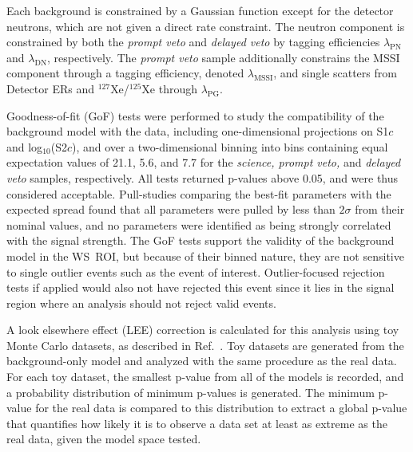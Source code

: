 Each background is constrained by a Gaussian function except for the detector neutrons, which are not given a direct rate constraint.
The neutron component is constrained by both the \emph{prompt veto} and \emph{delayed veto} by tagging efficiencies $\lambda_\text{PN}$ and $\lambda_\text{DN}$, respectively.
The \emph{prompt veto} sample additionally constrains the MSSI component through a tagging efficiency, denoted $\lambda_\text{MSSI}$, and single scatters from Detector ERs and $^{127}$Xe/$^{125}$Xe through $\lambda_\text{PG}$.


Goodness-of-fit (GoF) tests were performed to study the compatibility of the background model with the data, including one-dimensional projections on S1$c$ and log$_{10}$(S2$c$), and over a two-dimensional binning into bins containing equal expectation values of 21.1, 5.6, and 7.7 for the \emph{science, prompt veto,} and \emph{delayed veto} samples, respectively.
All tests returned p-values above 0.05, and were thus considered acceptable. Pull-studies comparing the best-fit parameters with the expected spread found that all parameters were pulled by less than $2\sigma$ from their nominal values, and no parameters were identified as being strongly correlated with the signal strength. 
The GoF tests support the validity of the background model in the WS~ROI, but because of their binned nature, they are not sensitive to single outlier events such as the event of interest. 
Outlier-focused rejection tests if applied would also not have rejected this event since it lies in the signal region where an analysis should not reject valid events.  


A look elsewhere effect (LEE) correction is calculated for this analysis using toy Monte Carlo datasets, as described in Ref.~\cite{DM_parameters:BAXTER2021_Conventions}.
Toy datasets are generated from the background-only model and analyzed with the same procedure as the real data. 
For each toy dataset, the smallest p-value from all of the models is recorded, and a probability distribution of minimum p-values is generated. 
The minimum p-value for the real data is compared to this distribution to extract a global p-value that quantifies how likely it is to observe a data set at least as extreme as the real data, given the model space tested.

